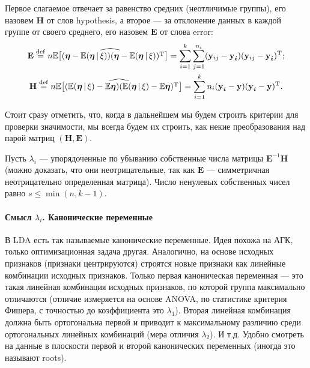 Первое слагаемое отвечает за равенство средних (неотличимые группы), его назовем $\mathbf{H}$ от слов hypothesis, а второе --- за отклонение данных в каждой группе от своего среднего, его назовем $\mathbf{E}$ от слова error:
\begin{gather*}
    \mathrm {\mathbf E} \overset{\mathrm{def}}{=}
    n\widehat {\mathbb E \big[(\bm \eta - \mathbb E (\bm \eta \, | \, \xi))
    (\bm \eta - \mathbb E (\bm \eta \, | \, \xi))^{\mathrm{T}}\big]} =
    \sum_{i=1}^k \sum_{j=1}^{n_i} (\mathbf y_{ij} - \bm {\mathbf y_i}) (\mathbf y_{ij} - \bm {\mathbf y_i})^{\mathrm{T}};\\
    \mathrm {\mathbf H} \overset{\mathrm{def}}{=}
    n\widehat{\mathbb E \big[(\mathbb E (\bm \eta \, | \, \xi) - \mathbb E \bm \eta)
    (\mathbb E (\bm \eta \, | \, \xi) - \mathbb E \bm \eta)^{\mathrm{T}}\big]} =
    \sum_{i=1}^k n_i (\bm {\mathbf y_i} - \bm {\mathbf y}) (\bm {\mathbf y_i} - \bm {\mathbf y})^{\mathrm{T}}.
\end{gather*}


Стоит сразу отметить, что, когда в дальнейшем мы будем строить критерии для проверки значимости,
мы всегда будем их строить, как некие преобразования над парой матриц $(\mathbf H, \mathbf E)$.

Пусть $\lambda_i$  --- упорядоченные по убыванию собственные числа матрицы $\mathbf{E}^{-1}\mathbf{H}$ (можно доказать, что они неотрицательные, так как $\mathbf{E}$ --- симметричная неотрицательно определенная матрица).
Число ненулевых собственных чисел равно $s\le \min(n, k-1)$.

\paragraph{Смысл $\lambda_i$. Канонические переменные}

В LDA есть так называемые канонические переменные. Идея похожа на АГК, только оптимизационная задача другая. Аналогично, на основе исходных признаков (признаки центрируются) строятся новые признаки как линейные комбинации исходных признаков. Только первая каноническая переменная --- это такая линейная комбинация исходных признаков, по которой группа максимально отличаются (отличие измеряется на основе ANOVA, по статистике критерия Фишера, с точностью до коэффициента это $\lambda_1$). Вторая линейная комбинация должна быть ортогональна первой и приводит к максимальному различию среди ортогональных линейных комбинаций (мера отличия $\lambda_2$). И т.д. Удобно смотреть на данные в плоскости первой и второй канонических переменных (иногда это называют roots).

